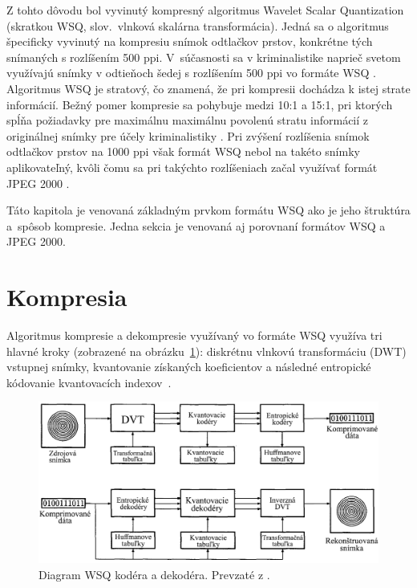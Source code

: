   Z tohto dôvodu bol vyvinutý kompresný algoritmus Wavelet Scalar Quantization (skratkou WSQ, slov.~vlnková skalárna transformácia).
  Jedná sa o algoritmus špecificky vyvinutý na kompresiu snímok odtlačkov prstov, konkrétne tých snímaných s rozlíšením 500 ppi. V~súčasnosti sa
  v kriminalistike naprieč svetom využívajú snímky v odtieňoch šedej s rozlíšením 500 ppi vo formáte WSQ \cite{Libert}.
  Algoritmus WSQ je stratový, čo znamená, že pri kompresii dochádza k istej strate informácií. Bežný pomer kompresie sa pohybuje medzi 10:1 a 15:1,
  pri ktorých spĺňa požiadavky pre maximálnu maximálnu povolenú stratu informácií z originálnej snímky pre účely kriminalistiky \cite{Handbook}.
  Pri zvýšení rozlíšenia snímok odtlačkov prstov na 1000 ppi však formát WSQ nebol na takéto snímky aplikovateľný, kvôli čomu sa pri takýchto rozlíšeniach
  začal využívať formát JPEG 2000 \cite{Libert}.

  Táto kapitola je venovaná základným prvkom formátu WSQ ako je jeho štruktúra a~spôsob kompresie. Jedna sekcia je venovaná aj porovnaní formátov
  WSQ a JPEG 2000.

  \section{Kompresia}
  Algoritmus kompresie a dekompresie využívaný vo formáte WSQ využíva tri hlavné kroky (zobrazené na obrázku~{\ref{obr:WSQ_diagram}}):
  diskrétnu vlnkovú transformáciu (DWT) vstupnej snímky, kvantovanie získaných koeficientov a následné entropické kódovanie kvantovacích indexov~{\cite{Bradley}}.

  \begin{figure}[h]
    \centering
    \includegraphics[width=0.8\linewidth]{obrazky-figures/WSQ_encoder_decoder.png}
    \caption{Diagram WSQ kodéra a dekodéra. Prevzaté z \cite{Bradley}.}
    \label{obr:WSQ_diagram}
  \end{figure}
  
